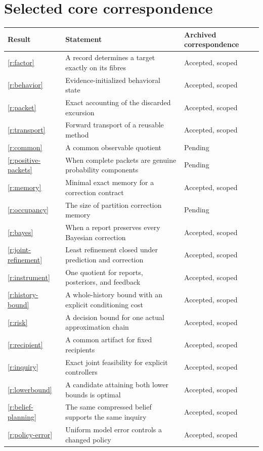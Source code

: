 \section*{Selected core correspondence}\small
\begin{longtable}{@{}p{.11\linewidth}p{.55\linewidth}p{.25\linewidth}@{}}\toprule Result & Statement & Archived correspondence\\\midrule\endhead
\ref{r:factor} & A record determines a target exactly on its fibres & Accepted, scoped\\
\ref{r:behavior} & Evidence-initialized behavioral state & Accepted, scoped\\
\ref{r:packet} & Exact accounting of the discarded excursion & Accepted, scoped\\
\ref{r:transport} & Forward transport of a reusable method & Accepted, scoped\\
\ref{r:common} & A common observable quotient & Pending\\
\ref{r:positive-packets} & When complete packets are genuine probability components & Pending\\
\ref{r:memory} & Minimal exact memory for a correction contract & Accepted, scoped\\
\ref{r:occupancy} & The size of partition correction memory & Pending\\
\ref{r:bayes} & When a report preserves every Bayesian correction & Accepted, scoped\\
\ref{r:joint-refinement} & Least refinement closed under prediction and correction & Accepted, scoped\\
\ref{r:instrument} & One quotient for reports, posteriors, and feedback & Accepted, scoped\\
\ref{r:history-bound} & A whole-history bound with an explicit conditioning cost & Accepted, scoped\\
\ref{r:risk} & A decision bound for one actual approximation chain & Accepted, scoped\\
\ref{r:recipient} & A common artifact for fixed recipients & Accepted, scoped\\
\ref{r:inquiry} & Exact joint feasibility for explicit controllers & Accepted, scoped\\
\ref{r:lowerbound} & A candidate attaining both lower bounds is optimal & Accepted, scoped\\
\ref{r:belief-planning} & The same compressed belief supports the same inquiry & Accepted, scoped\\
\ref{r:policy-error} & Uniform model error controls a changed policy & Accepted, scoped\\

\end{longtable}

